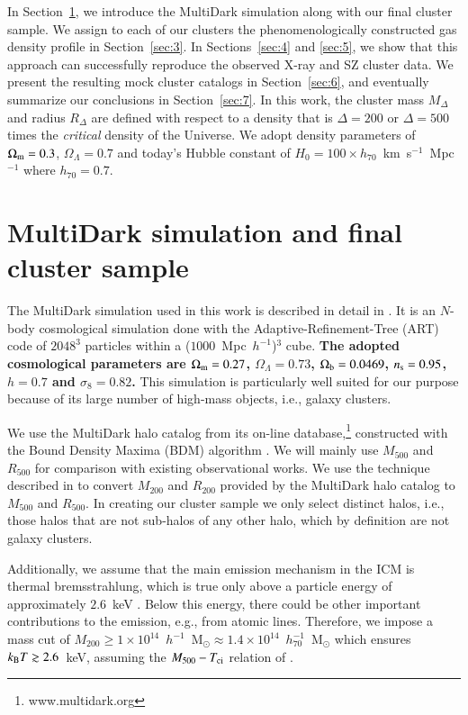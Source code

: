 \documentclass[useAMS,usenatbib]{mn2e}
\begin{document}
{In Section~\ref{sec:2}, we introduce the MultiDark simulation along with our
final cluster sample. We assign to each of our clusters the phenomenologically
constructed gas density profile in Section~\ref{sec:3}. In Sections~\ref{sec:4}
and \ref{sec:5}, we show that this approach can successfully reproduce the
observed X-ray and SZ cluster data. We present the resulting mock cluster
catalogs in Section~\ref{sec:6}, and eventually summarize our conclusions in
Section~\ref{sec:7}.  In this work, the cluster mass $M_{\Delta}$ and radius
$R_{\Delta}$ are defined with respect to a density that is $\Delta=200$ or
$\Delta=500$ times the \emph{critical} density of the Universe. We adopt density
parameters of $\Omega_{{\mathrm{m}}}=0.3$, $\Omega_{\Lambda}=0.7$ and today's Hubble
constant of $H_0 = 100 \times h_{70}$~km~s$^{-1}$~Mpc$^{-1}$ where $h_{70} =
0.7$.}




\section{MultiDark simulation and final cluster sample}
\label{sec:2}
The MultiDark simulation used in this work is described in detail in \cite{2011arXiv1104.5130P}.  
It is an $N$-body cosmological simulation done with the Adaptive-Refinement-Tree (ART) 
code \citep{1997ApJS..111...73K} of $2048^3$ particles within a ($1000$~Mpc~$h^{-1}$)$^3$ 
cube. {\bf The adopted cosmological parameters are $\Omega_{{\mathrm{m}}}=0.27$, $\Omega_{\Lambda}=0.73$,
$\Omega_{\mathrm{b}}=0.0469$, $n_{\mathrm{s}}=0.95$, $h=0.7$ and $\sigma_8=0.82$.} This simulation is 
particularly well suited for our purpose because of its large 
number of high-mass objects, i.e., galaxy clusters.
 
We use the MultiDark halo catalog from its on-line database,\footnote{www.multidark.org} 
constructed with the Bound Density Maxima (BDM) algorithm \citep{1997astro.ph.12217K}.  
We will mainly use $M_{500}$ and $R_{500}$ for comparison with existing observational works.  
We use the technique described in \cite{2003ApJ...584..702H} to convert $M_{200}$ and
$R_{200}$ provided by the MultiDark halo catalog to $M_{500}$ and $R_{500}$.  In
creating our cluster sample we only select distinct halos, i.e., those halos that
are not sub-halos of any other halo, which by definition are not galaxy clusters.

Additionally, we assume that the main emission mechanism in the ICM is thermal
bremsstrahlung, which is true only above a particle energy of approximately
$2.6$~keV \citep{1988xrec.book.....S}. Below this
energy, there could be other important contributions to the emission,
e.g., from atomic lines. Therefore, we impose a mass cut of
$M_{200}\geq1\times10^{14}$~$h^{-1}$~M$_{\odot}\approx1.4\times10^{14}$~$h_{70}^{-1}$~M$_{\odot}$
which ensures $k_{{\mathrm{B}}}T \gtrsim 2.6$~keV, assuming the $M_{500} - T_{{\mathrm{ci}}}$ relation
of \cite{2010MNRAS.406.1773M}.
\end{document}
